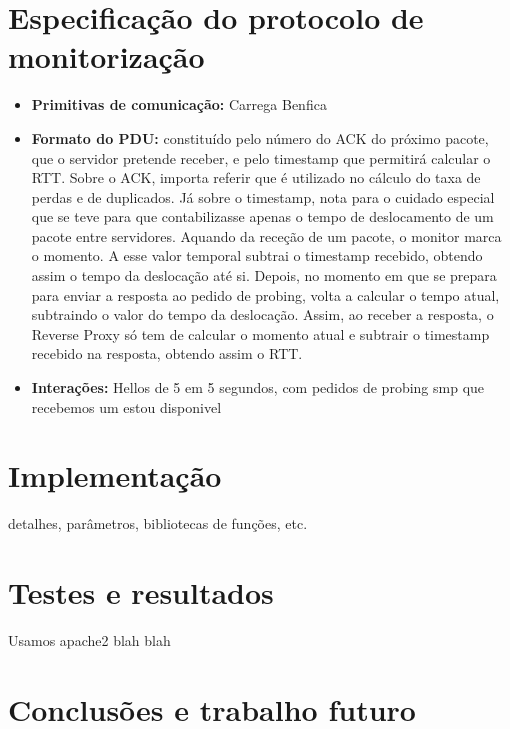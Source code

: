 \documentclass{llncs}
\begin{document}
\newpage

\section{Especificação do protocolo de monitorização}

\begin{itemize}
	\setlength\itemsep{1em}
\item \textbf{Primitivas de comunicação:} Carrega Benfica
\item \textbf{Formato do PDU:} constituído pelo número do ACK do próximo pacote, que o servidor pretende receber, e pelo timestamp que permitirá calcular o RTT. Sobre o ACK, importa referir que é utilizado no cálculo do taxa de perdas e de duplicados. Já sobre o timestamp, nota para o cuidado especial que se teve para que contabilizasse apenas o tempo de deslocamento de um pacote entre servidores. Aquando da receção de um pacote, o monitor marca o momento. A esse valor temporal subtrai o timestamp recebido, obtendo assim o tempo da deslocação até si. Depois, no momento em que se prepara para enviar a resposta ao pedido de probing, volta a calcular o tempo atual, subtraindo o valor do tempo da deslocação. Assim, ao receber a resposta, o Reverse Proxy só tem de calcular o momento atual e subtrair o timestamp recebido na resposta, obtendo assim o RTT.
\item \textbf{Interações:} Hellos de 5 em 5 segundos, com pedidos de probing smp que recebemos um estou disponivel
\end{itemize}

\newpage

\section{Implementação}

detalhes, parâmetros, bibliotecas de funções, etc.

\newpage

\section{Testes e resultados}

Usamos apache2 blah blah

\newpage

\section{Conclusões e trabalho futuro}
\end{document}
